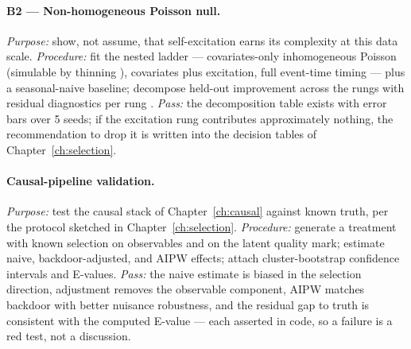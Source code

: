 \paragraph{B2 --- Non-homogeneous Poisson null.}
\emph{Purpose:} show, not assume, that self-excitation earns its complexity at this data scale.
\emph{Procedure:} fit the nested ladder --- covariates-only inhomogeneous Poisson (simulable by thinning
\cite{lewis1979}), covariates plus excitation, full event-time timing --- plus a seasonal-naive baseline;
decompose held-out improvement across the rungs with residual diagnostics per rung \cite{ogata1988}.
\emph{Pass:} the decomposition table exists with error bars over 5 seeds; if the excitation rung
contributes approximately nothing, the recommendation to drop it is written into the decision tables of
Chapter~\ref{ch:selection}.

\paragraph{Causal-pipeline validation.}
\emph{Purpose:} test the causal stack of Chapter~\ref{ch:causal} against known truth, per the protocol
sketched in Chapter~\ref{ch:selection}. \emph{Procedure:} generate a treatment with known selection on
observables and on the latent quality mark; estimate naive, backdoor-adjusted, and AIPW effects; attach
cluster-bootstrap confidence intervals and E-values. \emph{Pass:} the naive estimate is biased in the
selection direction, adjustment removes the observable component, AIPW matches backdoor with better
nuisance robustness, and the residual gap to truth is consistent with the computed E-value --- each asserted
in code, so a failure is a red test, not a discussion.

